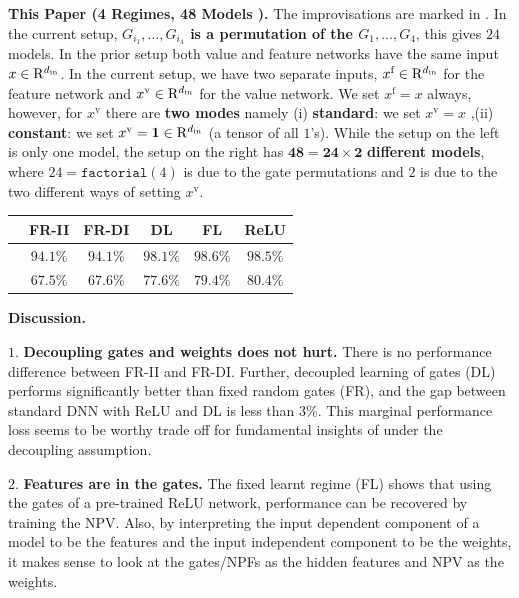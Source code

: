\textbf{This Paper (4 Regimes, 48 Models ).} The improvisations are marked in {\color{red}{red}}.  In the current setup, {\bf{$G_{i_1},\ldots,G_{i_4}$ is a permutation of the $G_1,\ldots,G_4$}}, this gives $24$ models. In the prior setup both value and feature networks have the same input $x\in\mathrm{R}^{d_{\text{in}}}$. In the current setup, we have two separate inputs, $x^{\text{f}}\in\mathrm{R}^{d_{\text{in}}}$ for the feature network and $x^{\text{v}}\in\mathrm{R}^{d_{\text{in}}}$ for the value network. We set $x^{\text{f}}=x$ always, however, for $x^{\text{v}}$ there are \textbf{two modes} namely (i) \textbf{standard}: we set $x^{\text{v}}=x$ ,(ii) \textbf{constant}: we set $x^{\text{v}}=\mathbf{1}\in\mathrm{R}^{d_{\text{in}}}$ (a tensor of all $1$'s). While the setup on the left is only one model, the setup on the right has $\mathbf{48=24\times 2}$ \textbf{different models}, where $24=\texttt{factorial}(4)$ is due to the gate permutations and $2$ is due to the two different ways of setting $x^{\text{v}}$.






\begin{tabular}{|p{1.75cm}|c|c|c|c|c|}\hline
& FR-II &FR-DI & DL& FL& ReLU\\\hline
\centering{FC (MNIST)} &$94.1\%$  &$94.1\%$  &$98.1\%$ &$98.6\%$ &$98.5\%$\\\hline
\centering{CNN (CIFAR-10)}&$67.5\%$ &$67.6\%$   &$77.6\%$ &$79.4\%$ &$80.4\%$\\\hline
\end{tabular}


\textbf{Discussion.}

\indent\quad $1.$ \textbf{Decoupling gates and weights does not hurt.} There is no performance difference between FR-II and FR-DI.  Further, decoupled learning of gates (DL) performs significantly better than fixed random gates (FR), and the gap between standard DNN with ReLU and DL is less than $3\%$. This marginal performance loss seems to be worthy trade off for fundamental insights of  under the decoupling assumption.

\indent\quad $2.$ \textbf{Features are in the gates.} The fixed learnt regime (FL) shows that using the gates of a pre-trained ReLU network, performance can be recovered by training the NPV. Also, by interpreting the input dependent component of a model to be the features and the input independent component to be the weights, it makes sense to look at the gates/NPFs as the hidden features and NPV as the weights.%

